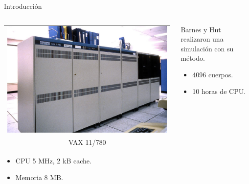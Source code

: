 \documentclass{beamer}
\begin{document}
\begin{frame}{Introducci\'on}
	\begin{columns}
		\begin{column}{.5\textwidth}
			\begin{tabular}{c}
				\includegraphics[width=\textwidth]{sources/images/DEC-VAX-11-780} \\
				VAX 11/780
			\end{tabular}
			\begin{itemize}
				\item CPU 5 MHz, 2 kB cache.
				\item Memoria 8 MB.
			\end{itemize}
		\end{column}
		\begin{column}{.5\textwidth}
			Barnes y Hut realizaron una simulaci\'on con su m\'etodo.
			\begin{itemize}
				\item<2-> 4096 cuerpos.
				\item<3-> 10 horas de CPU.
			\end{itemize}
		\end{column}
	\end{columns}
\end{frame}
\end{document}
